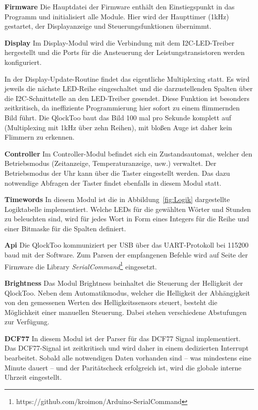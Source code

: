 \begin{multicols}{2}
\textbf{Firmware}
Die Hauptdatei der Firmware enthält den Einstiegspunkt in das Programm und initialisiert alle Module. Hier wird der Haupttimer (1kHz) gestartet, der Displayanzeige und Steuerungsfunktionen übernimmt.

\textbf{Display}
Im Display-Modul wird die Verbindung mit dem I2C-LED-Treiber hergestellt und die Ports für die Ansteuerung der Leistungstransistoren werden konfiguriert.

In der Display-Update-Routine findet das eigentliche Multiplexing statt. Es wird jeweils die nächste LED-Reihe eingeschaltet und die darzustellenden Spalten über die I2C-Schnittstelle an den LED-Treiber gesendet.
Diese Funktion ist besonders zeitkritisch, da ineffiziente Programmierung hier sofort zu einem flimmernden Bild führt.
Die QlockToo baut das Bild 100 mal pro Sekunde komplett auf (Multiplexing mit 1kHz über zehn Reihen), mit bloßen Auge ist daher kein Flimmern zu erkennen.

\textbf{Controller}
Im Controller-Modul befindet sich ein Zustandsautomat, welcher den Betriebsmodus (Zeitanzeige, Temperaturanzeige, usw.) verwaltet.
Der Betriebsmodus der Uhr kann über die Taster eingestellt werden. Das dazu notwendige Abfragen der Taster findet ebenfalls in diesem Modul statt.

\textbf{Timewords}
In diesem Modul ist die in Abbildung~\ref{fig:Logik} dargestellte Logiktabelle implementiert.
Welche LEDs für die gewählten Wörter und Stunden zu beleuchten sind, wird für jedes Wort in Form eines Integers für die Reihe und einer Bitmaske für die Spalten definiert.

\textbf{Api}
Die QlockToo kommuniziert per USB über das UART-Protokoll bei 115200 baud mit der Software.
Zum Parsen der empfangenen Befehle wird auf Seite der Firmware die Library \emph{SerialCommand}\footnote{https://github.com/kroimon/Arduino-SerialCommand} eingesetzt.

\textbf{Brightness}
Das Modul Brightness beinhaltet die Steuerung der Helligkeit der QlockToo. Neben dem Automatikmodus, welcher die Helligkeit der Abhängigkeit von den gemessenen Werten des Helligkeitssensors steuert, besteht die Möglichkeit einer manuellen Steuerung. Dabei stehen verschiedene Abstufungen zur Verfügung.

\textbf{DCF77}
In diesem Modul ist der Parser für das DCF77 Signal implementiert. Das DCF77-Signal ist zeitkritisch und wird daher in einem dedizierten Interrupt bearbeitet.
Sobald alle notwendigen Daten vorhanden sind -- was mindestens eine Minute dauert -- und der Paritätscheck erfolgreich ist, wird die globale interne Uhrzeit eingestellt.


\end{multicols}
